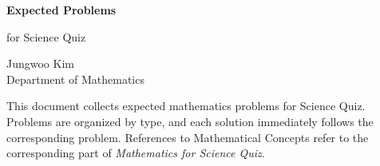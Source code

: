 \documentclass[11pt,oneside]{article}
\begin{document}
    \thispagestyle{empty}

    \begin{center}
        \vspace*{1.1cm}

        {\LARGE\bfseries Expected Problems\par}

        \vspace{0.25cm}

        {\large for Science Quiz\par}

        \vspace{0.75cm}

        {\normalsize
        Jungwoo Kim\\
        Department of Mathematics\\
        \PohangUniversityOfScienceAndTechnology
        \par}

    \end{center}

    \vspace{0.45cm}

    This document collects expected mathematics problems for Science Quiz.
    Problems are organized by type, and each solution immediately follows the
    corresponding problem. References to Mathematical Concepts refer to the
    corresponding part of \emph{Mathematics for Science Quiz}.

    \vspace{0.45cm}

    \tableofcontents

    
    
    
    
    
\end{document}

